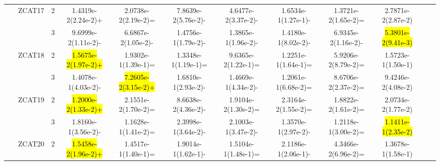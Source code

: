 \documentclass[a4paper,fleqn]{cas-dc}
\newcommand{\highlight}[1]{
	\begingroup
	\sethlcolor{Seashell}%
	\hl{#1}%
	\endgroup
}
\begin{document}
\begin{sloppypar}
\begin{table}[ht]
{\begin{tabular}{cccccccccccc}
					
					
					
					
					\multirow{12}{*}{~}&\multirow{2}{*}{ZCAT17}&2	&1.4319e-2(2.24e-2)+	&2.0738e-2(2.19e-2)=	&7.8639e-2(5.76e-2)-	&4.6477e-2(3.37e-2)-	&1.6534e-1(1.27e-1)-	&1.3721e-2(1.65e-2)=	&2.7871e-2(2.87e-2)\\
					
					\multirow{12}{*}{~}&\multirow{2}{*}{~}&3	&9.6999e-2(1.11e-2)-	&6.6867e-2(1.05e-2)-	&1.4756e-1(1.79e-2)-	&1.3865e-1(1.96e-2)-	&1.4180e-1(8.02e-2)-	&6.9345e-2(1.16e-2)-	&\highlight{5.3801e-2(9.41e-3)}\\
					
					
					
					
					
					
					\multirow{12}{*}{~}&\multirow{2}{*}{ZCAT18}&2 &\highlight{1.5675e-2(1.97e-2)+} &1.9302e-1(1.39e-1)=	&1.3348e-1(1.19e-1)=	&9.6365e-2(1.22e-1)=	&1.2251e-1(1.64e-1)=	&5.9206e-2(8.79e-2)=	&1.5723e-1(1.50e-1)\\
					
					\multirow{12}{*}{~}&\multirow{2}{*}{~}&3&1.4078e-1(4.03e-2)-	&\highlight{7.2605e-2(3.15e-2)+}	&1.6810e-1(2.93e-2)-	&1.4669e-1(4.34e-2)-	&1.2061e-1(6.68e-2)=	&8.6706e-2(2.37e-2)=	&9.4246e-2(4.08e-2)\\
					
					
					
					
					
					
					
					
					
					
					\multirow{12}{*}{~}&\multirow{2}{*}{ZCAT19}&2 &\highlight{1.2000e-2(1.33e-2)+}	&2.1551e-2(1.70e-2)=	&8.6638e-2(4.36e-2)-	&1.9104e-2(1.30e-2)=	&2.3164e-2(1.55e-2)=	&1.8822e-2(1.61e-2)=	&2.0734e-2(1.77e-2)\\
					
					\multirow{12}{*}{~}&\multirow{2}{*}{~}&3&1.8160e-1(3.56e-2)-	&1.1628e-1(1.41e-2)=	&2.3998e-1(3.64e-2)-	&2.1003e-1(3.47e-2)-	&1.3570e-1(2.97e-2)-	&1.2118e-1(3.00e-2)=	&\highlight{1.1411e-1(2.35e-2)}\\
					
					
					
					
					
					
					
					
					
					
					\multirow{12}{*}{~}&\multirow{2}{*}{ZCAT20}&2 &\highlight{1.5458e-2(1.96e-2)+}	&1.4517e-1(1.40e-1)=	&1.9014e-1(1.62e-1)-	&1.5104e-1(1.48e-1)=	&2.1186e-1(2.06e-1)-	&4.3466e-2(6.96e-2)=	&1.3678e-1(1.58e-1)\\
					

\end{tabular}}
\end{table}
\end{sloppypar}
\end{document}
